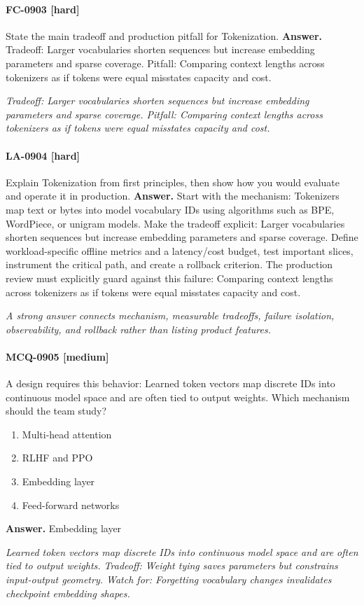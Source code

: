 \paragraph{FC-0903 [hard]} State the main tradeoff and production pitfall for Tokenization.
\noindent\textbf{Answer.} Tradeoff: Larger vocabularies shorten sequences but increase embedding parameters and sparse coverage. Pitfall: Comparing context lengths across tokenizers as if tokens were equal misstates capacity and cost.
\par\textit{Tradeoff: Larger vocabularies shorten sequences but increase embedding parameters and sparse coverage. Pitfall: Comparing context lengths across tokenizers as if tokens were equal misstates capacity and cost.}
\paragraph{LA-0904 [hard]} Explain Tokenization from first principles, then show how you would evaluate and operate it in production.
\noindent\textbf{Answer.} Start with the mechanism: Tokenizers map text or bytes into model vocabulary IDs using algorithms such as BPE, WordPiece, or unigram models. Make the tradeoff explicit: Larger vocabularies shorten sequences but increase embedding parameters and sparse coverage. Define workload-specific offline metrics and a latency/cost budget, test important slices, instrument the critical path, and create a rollback criterion. The production review must explicitly guard against this failure: Comparing context lengths across tokenizers as if tokens were equal misstates capacity and cost.
\par\textit{A strong answer connects mechanism, measurable tradeoffs, failure isolation, observability, and rollback rather than listing product features.}
\paragraph{MCQ-0905 [medium]} A design requires this behavior: Learned token vectors map discrete IDs into continuous model space and are often tied to output weights. Which mechanism should the team study?
\begin{enumerate}[label=\Alph*.]
\item Multi-head attention
\item RLHF and PPO
\item Embedding layer
\item Feed-forward networks
\end{enumerate}
\noindent\textbf{Answer.} Embedding layer
\par\textit{Learned token vectors map discrete IDs into continuous model space and are often tied to output weights. Tradeoff: Weight tying saves parameters but constrains input-output geometry. Watch for: Forgetting vocabulary changes invalidates checkpoint embedding shapes.}
